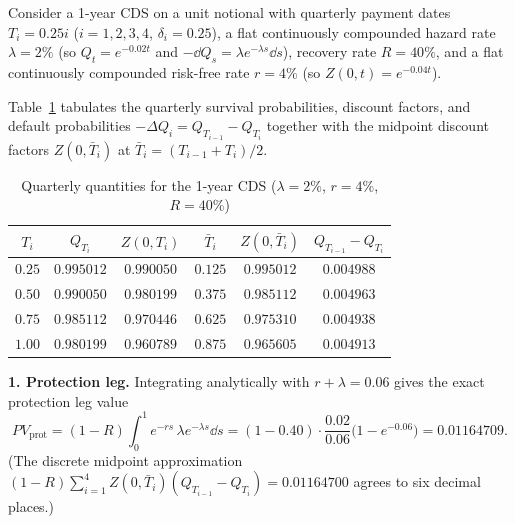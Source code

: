 \begin{example}\label{ex:cds-valuation}
    Consider a 1-year CDS on a unit notional with quarterly payment dates $T_i = 0.25i$ ($i = 1, 2, 3, 4$, $\delta_i = 0.25$), a flat continuously compounded hazard rate $\lambda = 2\%$ (so $Q_t = e^{-0.02t}$ and $-\dd Q_s = \lambda e^{-\lambda s}\dd s$), recovery rate $R = 40\%$, and a flat continuously compounded risk-free rate $r = 4\%$ (so $Z(0, t) = e^{-0.04t}$).

    Table~\ref{tab:cds-example} tabulates the quarterly survival probabilities, discount factors, and default probabilities $-\Delta Q_i = Q_{T_{i-1}} - Q_{T_i}$ together with the midpoint discount factors $Z(0, \bar{T}_i)$ at $\bar{T}_i = (T_{i-1} + T_i)/2$.

    \begin{table}[!htbp]
        \centering
        \caption{Quarterly quantities for the 1-year CDS ($\lambda = 2\%$, $r = 4\%$, $R = 40\%$)}\label{tab:cds-example}
        \begin{tabular}{cccccc}
            \toprule
            $T_i$ & $Q_{T_i}$ & $Z(0, T_i)$ & $\bar{T}_i$ & $Z(0, \bar{T}_i)$ & $Q_{T_{i-1}} - Q_{T_i}$ \\
            \midrule
            $0.25$ & $0.995012$ & $0.990050$ & $0.125$ & $0.995012$ & $0.004988$ \\
            $0.50$ & $0.990050$ & $0.980199$ & $0.375$ & $0.985112$ & $0.004963$ \\
            $0.75$ & $0.985112$ & $0.970446$ & $0.625$ & $0.975310$ & $0.004938$ \\
            $1.00$ & $0.980199$ & $0.960789$ & $0.875$ & $0.965605$ & $0.004913$ \\
            \bottomrule
        \end{tabular}
    \end{table}

    \textbf{1. Protection leg.} Integrating analytically with $r + \lambda = 0.06$ gives the exact protection leg value
    \[
    PV_{\text{prot}} = (1 - R)\int_0^1 e^{-rs}\,\lambda e^{-\lambda s}\dd s = (1 - 0.40)\cdot\frac{0.02}{0.06}\bigl(1 - e^{-0.06}\bigr) = 0.01164709.
    \]
    (The discrete midpoint approximation $(1 - R)\sum_{i=1}^4 Z(0, \bar{T}_i)(Q_{T_{i-1}} - Q_{T_i}) = 0.01164700$ agrees to six decimal places.)


\end{example}
